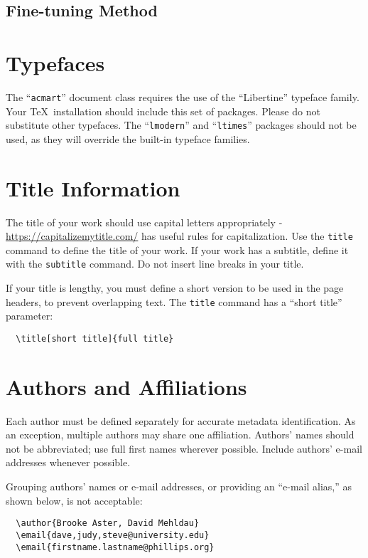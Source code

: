 \documentclass[sigconf]{acmart}
\begin{document}
\subsection{Fine-tuning Method}




\section{Typefaces}

The ``\verb|acmart|'' document class requires the use of the
``Libertine'' typeface family. Your \TeX\ installation should include
this set of packages. Please do not substitute other typefaces. The
``\verb|lmodern|'' and ``\verb|ltimes|'' packages should not be used,
as they will override the built-in typeface families.

\section{Title Information}

The title of your work should use capital letters appropriately -
\url{https://capitalizemytitle.com/} has useful rules for
capitalization. Use the {\verb|title|} command to define the title of
your work. If your work has a subtitle, define it with the
{\verb|subtitle|} command.  Do not insert line breaks in your title.

If your title is lengthy, you must define a short version to be used
in the page headers, to prevent overlapping text. The \verb|title|
command has a ``short title'' parameter:
\begin{verbatim}
  \title[short title]{full title}
\end{verbatim}

\section{Authors and Affiliations}

Each author must be defined separately for accurate metadata
identification.  As an exception, multiple authors may share one
affiliation. Authors' names should not be abbreviated; use full first
names wherever possible. Include authors' e-mail addresses whenever
possible.

Grouping authors' names or e-mail addresses, or providing an ``e-mail
alias,'' as shown below, is not acceptable:
\begin{verbatim}
  \author{Brooke Aster, David Mehldau}
  \email{dave,judy,steve@university.edu}
  \email{firstname.lastname@phillips.org}
\end{verbatim}
\end{document}
